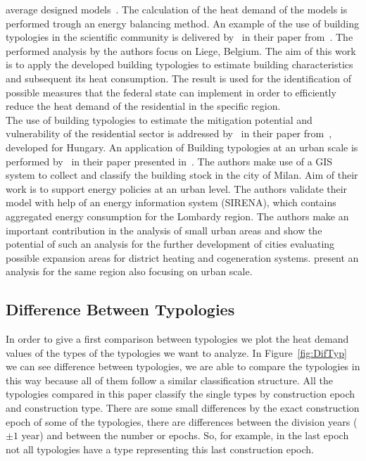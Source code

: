 average designed models~\cite{Kragh.2013}.  The calculation of the heat
demand of the models is performed trough an energy balancing method.  An
example of the use of building typologies in the scientific community is
delivered by~\citeauthor{Singh.2013} in their paper
from~\citeyear{Singh.2013}.  The performed analysis by the authors
focus on Liege, Belgium. The aim of this work is to apply the developed
building typologies to estimate building characteristics and subsequent its
heat consumption. The result is used for the identification of possible
measures that the federal state can implement in order to efficiently reduce
the heat demand of the residential in the specific region.\\

The use of building typologies to estimate the mitigation potential and
vulnerability of the residential sector is addressed
by~\citeauthor{Hrabovszky.2013} in their paper
from~\citeyear{Hrabovszky.2013}, developed for Hungary.  An
application of Building typologies at an urban scale is performed
by~\citeauthor{Manfren.2011} in their paper
presented in~\citeyear{Manfren.2011}.  The
authors make use of a GIS system to collect and classify the building stock in
the city of Milan.  Aim of their work is to support energy policies at an urban
level.  The authors validate their model with help of an energy information
system (SIRENA), which contains aggregated energy consumption for the Lombardy
region.
The authors make an important contribution in the analysis of small urban areas
and show the potential of such an analysis for the further development of
cities evaluating possible expansion areas for district heating and
cogeneration systems. \citet{DallO.2012} present
an analysis for the same region also focusing on urban scale.  \\



\subsection{Difference Between Typologies}

In order to give a first comparison between typologies we plot the heat demand
values of the types of the typologies we want to analyze.  In
Figure~\ref{fig:DifTyp} we can see difference between typologies, we are able
to compare the typologies in this way because all of them follow a similar
classification structure.  All the typologies compared in this paper classify
the single types by construction epoch and construction type. There are some
small differences by the exact construction epoch of some of the typologies,
there are differences between the division years ($\pm 1$ year) and between the
number or epochs.  So, for example, in the last epoch not all typologies have a
type representing this last construction epoch.\\

